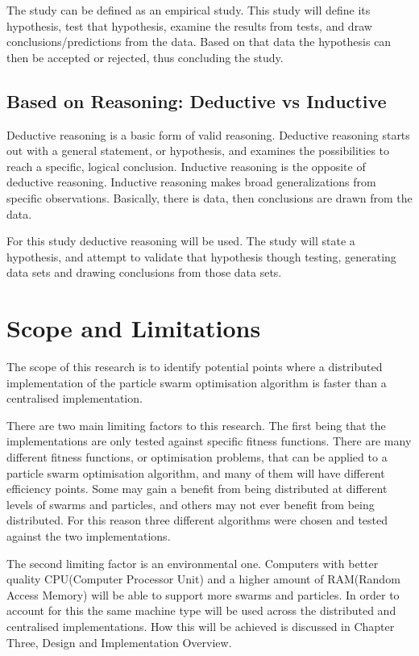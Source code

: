 \documentclass[oneside,12pt]{book}
\begin{document}
The study can be defined as an empirical study. This study will define its hypothesis, test that hypothesis, examine the results from tests, and draw conclusions/predictions from the data. Based on that data the hypothesis can then be accepted or rejected, thus concluding the study. 

\subsection{Based on Reasoning: Deductive vs Inductive}
Deductive reasoning is a basic form of valid reasoning. Deductive reasoning starts out with a general statement, or hypothesis, and examines the possibilities to reach a specific, logical conclusion.
Inductive reasoning is the opposite of deductive reasoning. Inductive reasoning makes broad generalizations from specific observations. Basically, there is data, then conclusions are drawn from the data. 

For this study deductive reasoning will be used. The study will state a hypothesis, and attempt to validate that hypothesis though testing, generating data sets and drawing conclusions from those data sets. 

\section{Scope and Limitations}
The scope of this research is to identify potential points where a distributed implementation of the particle swarm optimisation algorithm is faster than a centralised implementation. 

There are two main limiting factors to this research. The first being that the implementations are only tested against specific fitness functions. There are many different fitness functions, or optimisation problems, that can be applied to a particle swarm optimisation algorithm, and many of them will have different efficiency points. Some may gain a benefit from being distributed at different levels of swarms and particles, and others may not ever benefit from being distributed. For this reason three different algorithms were chosen and tested against the two implementations. 

The second limiting factor is an environmental one. Computers with better quality CPU(Computer Processor Unit) and a higher amount of RAM(Random Access Memory) will be able to support more swarms and particles. In order to account for this the same machine type will be used across the distributed and centralised implementations. How this will be achieved is discussed in Chapter Three, Design and Implementation Overview. 
\end{document}
